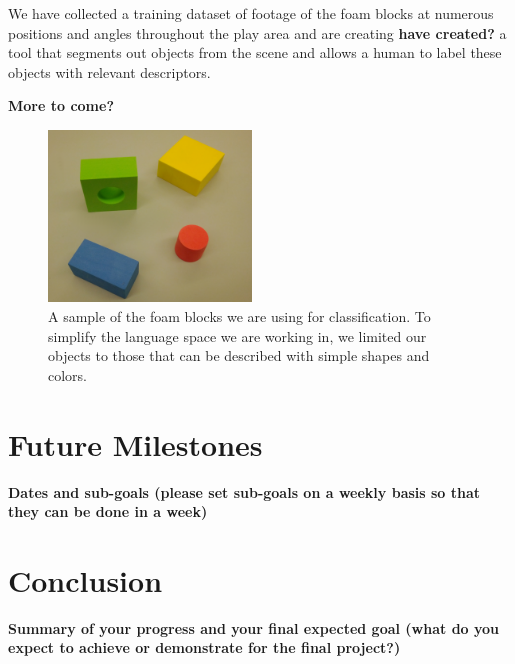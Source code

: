 \documentclass[11pt]{article}
\newcommand{\xxx}[1]{{\bf \color{red} #1}}
\begin{document}
We have collected a training dataset of footage of the foam blocks at numerous
positions and angles throughout the play area and are creating \xxx{have
created?} a tool that segments out objects from the scene and allows a human
to label these objects with relevant descriptors.

\xxx{More to come?}

\begin{figure}
\centering
\includegraphics[width=0.48\textwidth]{figures/blocks.png}
\caption{A sample of the foam blocks we are using for classification. To
    simplify the language space we are working in, we limited our objects to
    those that can be described with simple shapes and colors.}
\label{fig:blocks}
\end{figure}

\section{Future Milestones}
\xxx{Dates and sub-goals (please set sub-goals on a weekly basis so that they
    can be done in a week)}

\section{Conclusion}
\xxx{Summary of your progress and your final expected goal (what do you expect
    to achieve or demonstrate for the final project?)}



\end{document}

